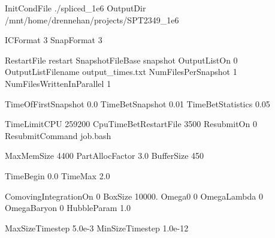
InitCondFile ./spliced_1e6
OutputDir     /mnt/home/drennehan/projects/SPT2349_1e6

ICFormat    3  %
SnapFormat  3  %

RestartFile                 restart
SnapshotFileBase            snapshot
OutputListOn                0  %
OutputListFilename          output_times.txt  %
NumFilesPerSnapshot         1
NumFilesWrittenInParallel   1  %

TimeOfFirstSnapshot     0.0
TimeBetSnapshot         0.01 
TimeBetStatistics       0.05 

TimeLimitCPU            259200  %
CpuTimeBetRestartFile   3500    %
ResubmitOn              0
ResubmitCommand         job.bash

MaxMemSize          4400    %
PartAllocFactor     3.0     %
BufferSize          450     %

TimeBegin   0.0    %
TimeMax     2.0    %

ComovingIntegrationOn   0       %
BoxSize                 10000.  %
Omega0                  0       %
OmegaLambda             0       %
OmegaBaryon             0       %
HubbleParam             1.0     %

MaxSizeTimestep         5.0e-3   %
MinSizeTimestep         1.0e-12 %

